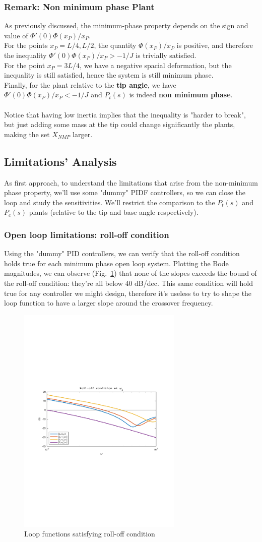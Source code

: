 \documentclass[a4paper, 12pt]{article}
\def\FigureTwo{\centering\includegraphics[width=0.7\textwidth]{Figures/fig02.pdf}}
\begin{document}
\subsubsection*{Remark: Non minimum phase Plant}
As previously discussed, the minimum-phase property depends on the sign and value of $\Phi'(0)\Phi(x_P)/x_P$.\\
For the points $x_P = L/4, L/2$, the quantity $\Phi(x_P)/x_P$ is positive, and therefore the inequality $\Phi'(0)\Phi(x_P)/x_P > -1/J$ is trivially satisfied.\\
For the point $x_P = 3L/4$, we have a negative spacial deformation, but the inequality is still satisfied, hence the system is still minimum phase.
\\Finally, for the plant relative to the \textbf{tip angle}, we have $\Phi'(0)\Phi(x_P)/x_P < -1/J$ and $P_t(s)$ is indeed \textbf{non minimum phase}.\\\\Notice that having low inertia implies that the inequality is "harder to break", but just adding some mass at the tip could change significantly the plants, making the set $X_{NMP}$ larger.

\subsection{Limitations' Analysis}
As first approach, to understand the limitations that arise from the non-minimum phase property, we'll use some "dummy" PIDF controllers, so we can close the loop and study the sensitivities. We'll restrict the comparison to the $P_t(s)$ and $P_c(s)$ plants (relative to the tip and base angle respectively).
\subsubsection{Open loop limitations: roll-off condition}
Using the "dummy" PID controllers, we can verify that the roll-off condition holds true for each minimum phase open loop system.
Plotting the Bode magnitudes, we can observe (Fig.~\ref{fig:fig02}) that none of the slopes exceeds the bound of the roll-off condition: they're all below 40 dB/dec. This same condition will hold true for any controller we might design, therefore it's useless to try to shape the loop function to have a larger slope around the crossover frequency.
\begin{figure}[h!]
    \FigureTwo
    \caption{Loop functions satisfying roll-off condition}
    \label{fig:fig02}
\end{figure}
\end{document}
